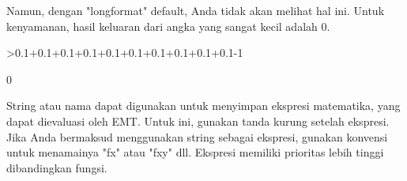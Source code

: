 \documentclass[a4paper,10pt]{article}
\begin{document}
\begin{eulernotebook}
\begin{eulercomment}
Namun, dengan "longformat" default, Anda tidak akan melihat hal ini.
Untuk kenyamanan, hasil keluaran dari angka yang sangat kecil adalah
0.
\end{eulercomment}
\begin{eulerprompt}
>0.1+0.1+0.1+0.1+0.1+0.1+0.1+0.1+0.1+0.1-1
\end{eulerprompt}
\begin{euleroutput}
  0
\end{euleroutput}
\begin{eulercomment}
String atau nama dapat digunakan untuk menyimpan ekspresi matematika,
yang dapat dievaluasi oleh EMT. Untuk ini, gunakan tanda kurung
setelah ekspresi. Jika Anda bermaksud menggunakan string sebagai
ekspresi, gunakan konvensi untuk menamainya "fx" atau "fxy" dll.
Ekspresi memiliki prioritas lebih tinggi dibandingkan fungsi.


\end{eulercomment}
\end{eulernotebook}
\end{document}
